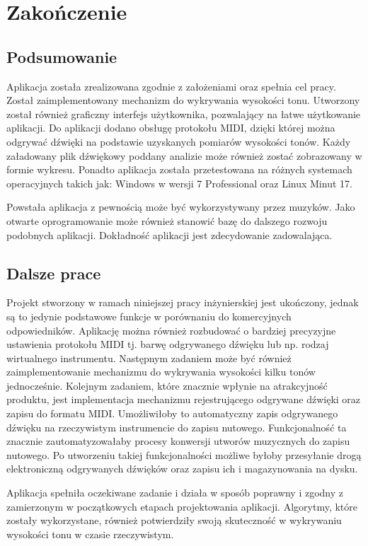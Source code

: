 


\chapter*{Zakończenie}

\thispagestyle{empty}

\section*{Podsumowanie}
Aplikacja została zrealizowana zgodnie z założeniami oraz spełnia cel pracy. Został zaimplementowany mechanizm do wykrywania wysokości tonu. Utworzony został również graficzny interfejs użytkownika, pozwalający na łatwe użytkowanie aplikacji. Do aplikacji dodano obsługę protokołu MIDI, dzięki której można odgrywać dźwięki na podstawie uzyskanych pomiarów wysokości tonów. Każdy załadowany plik dźwiękowy poddany analizie może również zostać zobrazowany w formie wykresu. Ponadto aplikacja została przetestowana na różnych systemach operacyjnych takich jak: Windows w wersji 7 Professional oraz Linux Minut 17.


Powstała aplikacja z pewnością może być wykorzystywany przez muzyków. Jako otwarte oprogramowanie może również stanowić bazę do dalszego rozwoju podobnych aplikacji. Dokładność aplikacji jest zdecydowanie zadowalająca.




 
\section*{Dalsze prace}
Projekt stworzony w ramach niniejszej pracy inżynierskiej jest ukończony, jednak są to jedynie podstawowe funkcje w porównaniu do komercyjnych odpowiedników. Aplikację można również rozbudować o bardziej precyzyjne ustawienia protokołu MIDI tj. barwę odgrywanego dźwięku lub np. rodzaj wirtualnego instrumentu. Następnym zadaniem może być również zaimplementowanie mechanizmu do wykrywania wysokości kilku tonów jednocześnie. Kolejnym zadaniem, które znacznie wpłynie na atrakcyjność produktu, jest implementacja mechanizmu rejestrującego odgrywane dźwięki oraz zapisu do formatu MIDI. Umożliwiłoby to automatyczny zapis odgrywanego dźwięku na rzeczywistym instrumencie do zapisu nutowego. Funkcjonalność ta znacznie zautomatyzowałaby procesy konwersji utworów muzycznych do zapisu nutowego. Po utworzeniu takiej funkcjonalności możliwe byłoby przesyłanie drogą elektroniczną odgrywanych dźwięków oraz zapisu ich i magazynowania na dysku.


Aplikacja spełniła oczekiwane zadanie i działa w sposób poprawny i zgodny z zamierzonym w początkowych etapach projektowania aplikacji. Algorytmy, które zostały wykorzystane, również potwierdziły swoją skuteczność w wykrywaniu wysokości tonu w czasie rzeczywistym.